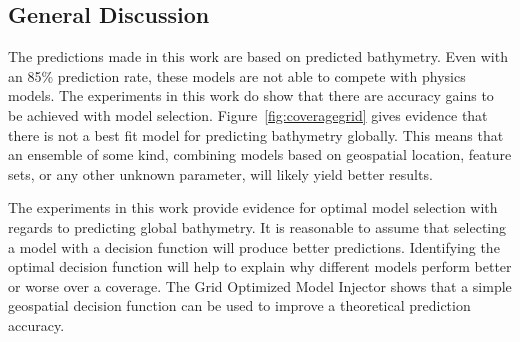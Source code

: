 
\subsection{General Discussion}
The predictions made in this work are based on predicted bathymetry.
Even with an 85\% prediction rate, these models are not able to compete with physics models.
The experiments in this work do show that there are accuracy gains to be achieved with model selection.
Figure~\ref{fig:coveragegrid} gives evidence that there is not a best fit model for predicting bathymetry globally.
This means that an ensemble of some kind, combining models based on geospatial location, feature sets, or any other unknown parameter, will likely yield better results.

The experiments in this work provide evidence for optimal model selection with regards to predicting global bathymetry.
It is reasonable to assume that selecting a model with a decision function will produce better predictions.
Identifying the optimal decision function will help to explain why different models perform better or worse over a coverage.
The Grid Optimized Model Injector shows that a simple geospatial decision function can be used to improve a theoretical prediction accuracy.
